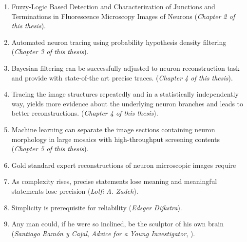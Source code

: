 \documentclass[10pt]{report}%
\begin{document}
\begin{enumerate}
  
\item Fuzzy-Logic Based Detection and Characterization of Junctions and Terminations in Fluorescence Microscopy Images of Neurons 
(\emph{Chapter 2 of this thesis}). 
  
\medskip
  
\item Automated neuron tracing using probability hypothesis density filtering
	(\emph{Chapter 3 of this thesis}).  
  
\medskip
\item Bayesian filtering can be successfully adjusted to neuron reconstruction task and provide with state-of-the art precise traces. 
	(\emph{Chapter 4 of this thesis}).
	
\medskip
\item Tracing the image structures repeatedly and in a statistically independently way, yields more evidence about the underlying neuron branches and leads to better reconstructions.
	(\emph{Chapter 4 of this thesis}).

\medskip
\item Machine learning can separate the image sections containing neuron morphology in large mosaics with high-throughput screening contents (\emph{Chapter 5 of this thesis}). 

\medskip
\item Gold standard expert reconstructions of neuron microscopic images require 

\medskip 

\item As complexity rises, precise statements lose meaning and meaningful statements lose precision (\emph{Lotfi A. Zadeh}). 

\medskip
  
\item Simplicity is prerequisite for reliability (\emph{Edsger Dijkstra}).

\medskip

\item Any man could, if he were so inclined, be the sculptor of his own brain (\emph{Santiago Ram\'{o}n y Cajal}, \emph{Advice for a Young Investigator}, ).


\end{enumerate}
\end{document}
